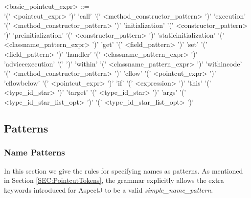 \begin{minipage}{6in}
\begin{blue}
\begin{grammar}
<basic_pointcut_expr> ::= \hspace{1in} \\
       '(' <pointcut_expr> ')'
\alt   'call' '(' <method_constructor_pattern> ')'
\alt   'execution' '(' <method_constructor_pattern> ')'
\alt   'initialization' '(' <constructor_pattern> ')'
\alt   'preinitialization' '(' <constructor_pattern> ')'
\alt   'staticinitialization' '(' <classname_pattern_expr> ')'
\alt   'get' '(' <field_pattern> ')'
\alt   'set' '(' <field_pattern> ')'
\alt   'handler' '(' <classname_pattern_expr> ')'
\alt   'adviceexecution' '(' ')'
\alt   'within' '(' <classname_pattern_expr> ')'
\alt   'withincode' '(' <method_constructor_pattern> ')'
\alt   'cflow' '(' <pointcut_expr> ')'
\alt   'cflowbelow' '(' <pointcut_expr> ')'
\alt   'if' '(' {\red <expression> } ')'
\alt   'this' '(' <type_id_star> ')'
\alt   'target' '(' <type_id_star> ')'
\alt   'args' '(' <type_id_star_list_opt> ')'
 '(' <type_id_star_list_opt> ')'
\end{grammar}
\end{blue}
\end{minipage}


\subsection{Patterns}

\subsubsection{Name Patterns \label{SEC:NamePatterns}}

In this section we give the rules for specifying names as
patterns.   As mentioned in Section \ref{SEC:PointcutTokens}, 
the grammar explicitly allows the extra keywords introduced for
AspectJ to be a valid {\em simple\_name\_pattern}.

